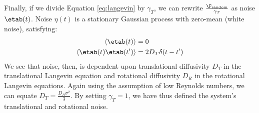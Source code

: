 Finally, if we divide Equation \ref{eq:langevin} by $\gamma_T$, we can rewrite $\frac{\F_\text{random}}{\gamma_T}$ as noise $\etab(t)$. Noise ${\eta}(t)$ is a stationary Gaussian process with zero-mean (white noise), satisfying:
\begin{equation}
\begin{aligned}
\langle \etab(t) \rangle &= 0 \\
\langle \etab(t)\etab(t') \rangle &= 2D_T\delta(t-t')
\end{aligned}
\end{equation}
We see that noise, then, is dependent upon translational diffusivity $D_T$ in the translational Langevin equation and rotational diffusivity $D_R$ in the rotational Langevin equations. Again using the assumption of low Reynolds numbers, we can equate $D_T = \frac{D_R\sigma^2}{3}$. By setting $\gamma_T=1$, we have thus defined the system's translational and rotational noise.


